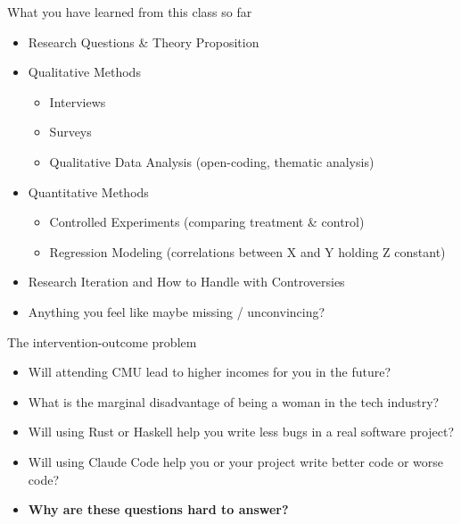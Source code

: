 \documentclass[aspectratio=169, 12pt]{beamer}
\newcommand{\redt}[1]{\textcolor{emphred}{#1}}
\begin{document}

{
\begin{frame}[plain]
  \titlepage
\end{frame}
}

\begin{frame}{What you have learned from this class so far}
\begin{itemize}\setlength\itemsep{0.4em}
  \item Research Questions \& Theory Proposition
  \item Qualitative Methods
    \begin{itemize}
      \item Interviews
      \item Surveys
      \item Qualitative Data Analysis (open-coding, thematic analysis)
    \end{itemize}
  \item Quantitative Methods
    \begin{itemize}
      \item Controlled Experiments (comparing treatment \& control)
      \item Regression Modeling (correlations between X and Y holding Z constant)
    \end{itemize}
  \item Research Iteration and How to Handle with Controversies
  \item Anything you feel like maybe missing / unconvincing?
\end{itemize}
\end{frame}

\begin{frame}{The intervention-outcome problem}
\begin{itemize}\setlength\itemsep{1.2em}
  \item Will attending CMU lead to higher incomes \redt{for you} in the future?
  \item What is the \redt{marginal disadvantage of being a woman} in the tech industry?
  \item Will using Rust or Haskell \redt{help you write less bugs} in a real software project?
  \item Will using Claude Code \redt{help you or your project} write better code or worse code?
  \item \textbf{Why are these questions hard to answer?}
\end{itemize}
\end{frame}
\end{document}
